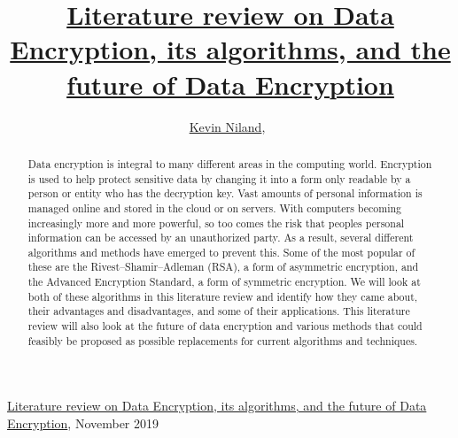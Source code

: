 \documentclass[journal]{IEEEtran}
\begin{document}
%
{\href{https://github.com/kevinniland97/Literature-review-on-Data-Encryption-algorithm}{Literature review on Data Encryption, its algorithms, and the future of Data Encryption}, November 2019}

\title{\href{https://github.com/kevinniland97/Literature-review-on-Data-Encryption-algorithms}{Literature review on Data Encryption, its algorithms, and the future of Data Encryption}}
\author{\href{https://github.com/kevinniland97}{Kevin Niland},~}
\maketitle

\begin{abstract}
Data encryption is integral to many different areas in the computing world. Encryption is used to help protect sensitive data by changing it into a form only readable by a person or entity who has the decryption key. Vast amounts of personal information is managed online and stored in the cloud or on servers. With computers becoming increasingly more and more powerful, so too comes the risk that peoples personal information can be accessed by an unauthorized party. As a result, several different algorithms and methods have emerged to prevent this. Some of the most popular of these are the Rivest–Shamir–Adleman (RSA), a form of asymmetric encryption, and the Advanced Encryption Standard, a form of symmetric encryption. We will look at both of these algorithms in this literature review and identify how they came about, their advantages and disadvantages, and some of their applications. This literature review will also look at the future of data encryption and various methods that could feasibly be proposed as possible replacements for current algorithms and techniques. 
\end{abstract}
\end{document}
